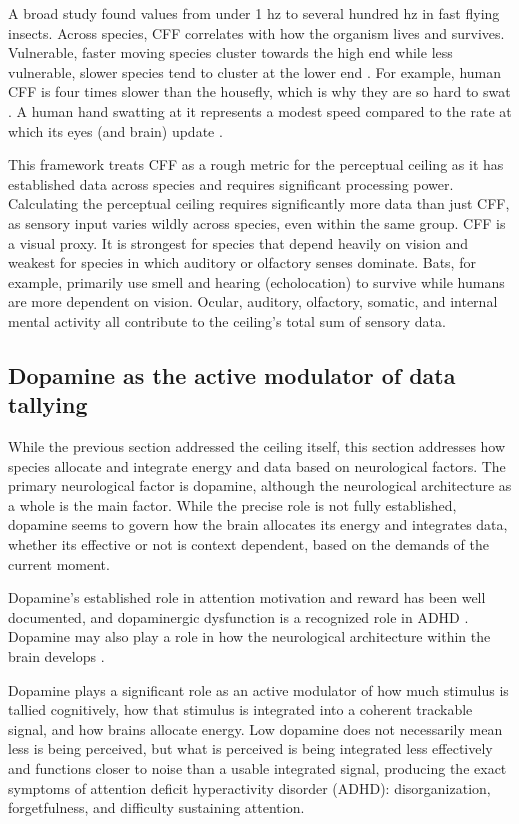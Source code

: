 \documentclass[11pt,a4paper]{article}
\begin{document}
A broad study found values from under 1 hz to several hundred hz in fast flying insects. Across species, CFF correlates with how the organism lives and survives. Vulnerable, faster moving species cluster towards the high end while less vulnerable, slower species tend to cluster at the lower end \citep{lafitte2022}. For example, human CFF is four times slower than the housefly, which is why they are so hard to swat \citep{haarlem2024speed}. A human hand swatting at it represents a modest speed compared to the rate at which its eyes (and brain) update \citep{coile1989}.

This framework treats CFF as a rough metric for the perceptual ceiling as it has established data across species and requires significant processing power. Calculating the perceptual ceiling requires significantly more data than just CFF, as sensory input varies wildly across species, even within the same group. CFF is a visual proxy. It is strongest for species that depend heavily on vision and weakest for species in which auditory or olfactory senses dominate. Bats, for example, primarily use smell and hearing (echolocation) to survive while humans are more dependent on vision. Ocular, auditory, olfactory, somatic, and internal mental activity all contribute to the ceiling’s total sum of sensory data.

\subsection{Dopamine as the active modulator of data tallying}

While the previous section addressed the ceiling itself, this section addresses how species allocate and integrate energy and data based on neurological factors. The primary neurological factor is dopamine, although the neurological architecture as a whole is the main factor. While the precise role is not fully established, dopamine seems to govern how the brain allocates its energy and integrates data, whether its effective or not is context dependent, based on the demands of the current moment.

Dopamine's established role in attention motivation and reward has been well documented, and dopaminergic dysfunction is a recognized role in ADHD \citep{volkow2011}. Dopamine may also play a role in how the neurological architecture within the brain develops \citep{silberstein2016}.

Dopamine plays a significant role as an active modulator of how much stimulus is tallied cognitively, how that stimulus is integrated into a coherent trackable signal, and how brains allocate energy. Low dopamine does not necessarily mean less is being perceived, but what is perceived is being integrated less effectively and functions closer to noise than a usable integrated signal, producing the exact symptoms of attention deficit hyperactivity disorder (ADHD): disorganization, forgetfulness, and difficulty sustaining attention.
\end{document}
